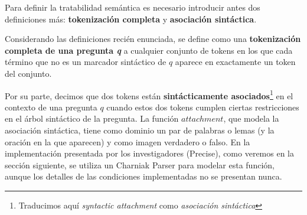 \medskip

Para definir la tratabilidad semántica es necesario introducir antes dos definiciones más: \textbf{tokenización completa} y \textbf{asociación sintáctica}.

Considerando las definiciones recién enunciada, se define como una \textbf{tokenización completa de una pregunta \textit{q}} a cualquier conjunto de tokens en los que cada término que no es un marcador sintáctico de $q$ aparece en exactamente un token del conjunto.

Por su parte, decimos que dos tokens están \textbf{sintácticamente asociados}\footnote{Traducimos aquí \textit{syntactic attachment} como \textit{asociación sintáctica}} en el contexto de una pregunta $q$ cuando estos dos tokens cumplen ciertas restricciones en el árbol sintáctico de la pregunta.
La función $attachment$, que modela la asociación sintáctica, tiene como dominio un par de palabras o lemas (y la oración en la que aparecen) y como imagen verdadero o falso. En la implementación presentada por los investigadores (Precise), como veremos en la sección siguiente, se utiliza un Charniak Parser para modelar esta función, aunque los detalles de las condiciones implementadas no se presentan nunca.

